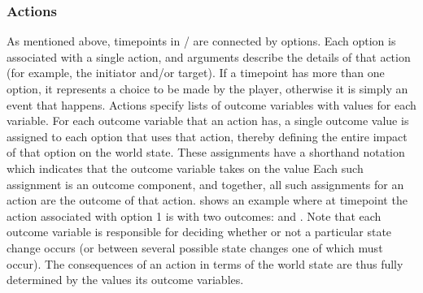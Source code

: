 \subsubsection{Actions}

As mentioned above, timepoints in \dunyazad/ are connected by options.
%
Each option is associated with a single action, and arguments describe the details of that action (for example, the initiator and/or target).
%
If a timepoint has more than one option, it represents a choice to be made by the player, otherwise it is simply an event that happens.
%
Actions specify lists of outcome variables with values for each variable.
%
For each outcome variable that an action has, a single outcome value is assigned to each option that uses that action, thereby defining the entire impact of that option on the world state.
%
These assignments have a shorthand notation  which indicates that the outcome variable  takes on the value 
%
Each such assignment is an outcome component, and together, all such assignments for an action are the outcome of that action.
%
 shows an example where at timepoint  the action associated with option 1 is  with two outcomes:  and .
%
Note that each outcome variable is responsible for deciding whether or not a particular state change occurs (or between several possible state changes one of which must occur).
%
The consequences of an action in terms of the world state are thus fully determined by the values its outcome variables.

